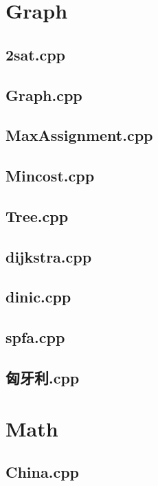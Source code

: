 \section{Graph}
\subsection{2sat.cpp}

\subsection{Graph.cpp}

\subsection{MaxAssignment.cpp}

\subsection{Mincost.cpp}

\subsection{Tree.cpp}

\subsection{dijkstra.cpp}

\subsection{dinic.cpp}

\subsection{spfa.cpp}

\subsection{匈牙利.cpp}

\section{Math}
\subsection{China.cpp}

